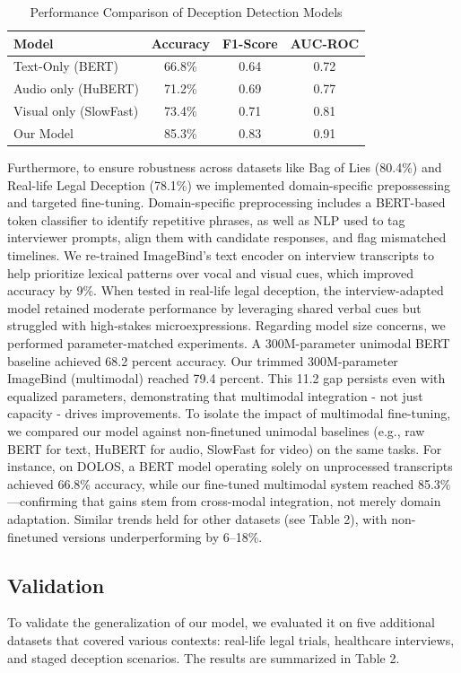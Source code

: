 \documentclass{article} %
\begin{document}
\begin{table}[htbp]
\centering
\begin{tabular}{lccc}
\toprule
\textbf{Model} & \textbf{Accuracy} & \textbf{F1-Score} & \textbf{AUC-ROC} \\
\midrule
Text-Only (BERT) & 66.8\% & 0.64 & 0.72 \\
Audio only (HuBERT) & 71.2\% & 0.69 & 0.77 \\ 
Visual only (SlowFast) & 73.4\% & 0.71 & 0.81 \\
Our Model & 85.3\% & 0.83 & 0.91 \\
\bottomrule
\end{tabular}
\caption{Performance Comparison of Deception Detection Models}
\label{tab:performance}
\end{table}
Furthermore, to ensure robustness across datasets like Bag of Lies (80.4\%) and Real-life Legal Deception (78.1\%) we implemented domain-specific prepossessing and targeted fine-tuning. Domain-specific preprocessing includes a BERT-based token classifier to identify repetitive phrases, as well as NLP used to tag interviewer prompts, align them with candidate responses, and flag mismatched timelines. We re-trained ImageBind's text encoder on interview transcripts to help prioritize lexical patterns over vocal and visual cues, which improved accuracy by 9\%. When tested in real-life legal deception, the interview-adapted model retained moderate performance by leveraging shared verbal cues but struggled with high-stakes microexpressions. Regarding model size concerns, we performed parameter-matched experiments. A 300M-parameter unimodal BERT baseline achieved 68.2 percent accuracy. Our trimmed 300M-parameter ImageBind (multimodal) reached 79.4 percent. This 11.2 gap persists even with equalized parameters, demonstrating that multimodal integration - not just capacity - drives improvements. To isolate the impact of multimodal fine-tuning, we compared our model against non-finetuned unimodal baselines (e.g., raw BERT for text, HuBERT for audio, SlowFast for video) on the same tasks. For instance, on DOLOS, a BERT model operating solely on unprocessed transcripts achieved 66.8\% accuracy, while our fine-tuned multimodal system reached 85.3\%—confirming that gains stem from cross-modal integration, not merely domain adaptation. Similar trends held for other datasets (see Table 2), with non-finetuned versions underperforming by 6–18\%.

\subsection{Validation}
To validate the generalization of our model, we evaluated it on five additional datasets that covered various contexts: real-life legal trials, healthcare interviews, and staged deception scenarios. The results are summarized in Table 2.
\end{document}
